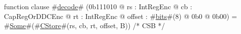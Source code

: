 function clause #\hyperref[sailMIPSzdecode]{decode}# (0b111010 @ rs : IntRegEnc @ cb : CapRegOrDDCEnc @ rt : IntRegEnc @ offset : #\hyperref[sailMIPSzbits]{bits}#(8) @ 0b0 @ 0b00) = #\hyperref[sailMIPSzSome]{Some}#(#\hyperref[sailMIPSzCStore]{CStore}#(rs, cb, rt, offset, B)) /* CSB */
